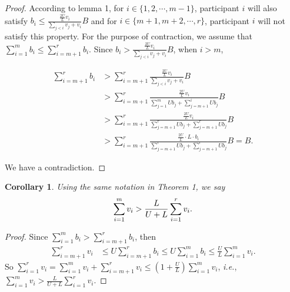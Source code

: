 \documentclass[conference,compsocconf,letterpaper,10pt]{IEEEtran}
\newtheorem{corollary}{Corollary}
\newcommand{\ie}{{\em i.e.}}
\begin{document}
\begin{proof}
According to lemma 1, for $i \in \{1,2,\cdots, m-1\}$, participant $i$ will also satisfy $b_i \le \frac{\frac{2U}{L}v_i}{\sum_{j<i}v_j+v_i}B$ and for $i \in \{m+1,m+2,\cdots, r\}$, participant $i$ will not satisfy this property. For the purpose of contraction, we assume that $\sum_{i=1}^{m} b_i \le \sum_{i=m+1}^{r}b_i$. Since $b_i > \frac{\frac{2U}{L}v_i}{\sum_{j<i}v_j+v_i}B$, when $i > m$,
\begin{small}
\begin{align}
\nonumber \sum_{i=m+1}^{r}b_i  &> \sum_{i=m+1}^{r}\frac{\frac{2U}{L}v_i}{\sum_{j<i}v_j+v_i}B \\
\nonumber &> \sum_{i=m+1}^{r}\frac{\frac{2U}{L}v_i}{\sum_{j=1}^{m}Ub_j+\sum_{j=m+1}^{i}Ub_j}B \\
\nonumber &> \sum_{i=m+1}^{r}\frac{\frac{2U}{L}v_i}{\sum_{j=m+1}^{r}Ub_j+\sum_{j=m+1}^{r}Ub_j}B \\
\nonumber &> \sum_{i=m+1}^{r}\frac{\frac{2U}{L} \cdot L \cdot b_i}{\sum_{j=m+1}^{r}Ub_j+\sum_{j=m+1}^{r}Ub_j}B = B .
\end{align}
\end{small}
We have a contradiction.
\end{proof}

\begin{corollary}
Using the same notation in Theorem 1, we say
\begin{equation}
\sum_{i=1}^{m} v_i > \frac{L}{U+L}\sum_{i=1}^{r} v_i. \notag
\end{equation}
\end{corollary}


\begin{proof}
Since  $\sum_{i=1}^{m} b_i > \sum_{i=m+1}^{r}b_i$, then
\begin{align}
\nonumber \sum_{i=m+1}^{r} v_i &\le U\sum_{i=m+1}^{r} b_i  \le U\sum_{i=1}^{m} b_i \le \frac{U}{L}\sum_{i=1}^{m} v_i.
\end{align}
So $\sum_{i=1}^{r} v_i = \sum_{i=1}^{m} v_i + \sum_{i=m+1}^{r} v_i \le (1+\frac{U}{L})\sum_{i=1}^{m} v_i$, \ie, $\sum_{i=1}^{m} v_i > \frac{L}{U+L}\sum_{i=1}^{r} v_i$.
\end{proof}
\end{document}
